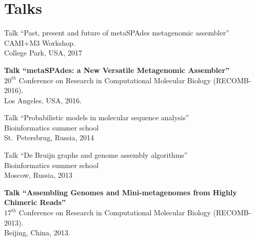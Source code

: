 \section{Talks} %
\begin{innerlist}
 \item Talk ``Past, present and future of metaSPAdes metagenomic assembler''\\
       CAMI+M3 Workshop.\\
       College Park, USA, 2017
 \item \textbf{Talk ``metaSPAdes: a New Versatile Metagenomic Assembler''}\\
       $20^{th}$ Conference on Research in Computational Molecular Biology (RECOMB-2016).\\ 
       Los Angeles, USA, 2016.
 \item Talk ``Probabilistic models in molecular sequence analysis''\\
       Bioinformatics summer school\\
       St.~Petersbrug, Russia, 2014
 \item Talk ``De Bruijn graphs and genome assembly algorithms''\\
       Bioinformatics summer school\\
       Moscow, Russia, 2013
 \item \textbf{Talk ``Assembling Genomes and Mini-metagenomes from Highly Chimeric Reads''}\\
       $17^{th}$ Conference on Research in Computational Molecular Biology (RECOMB-2013).\\ 
       Beijing, China, 2013.

\end{innerlist}
